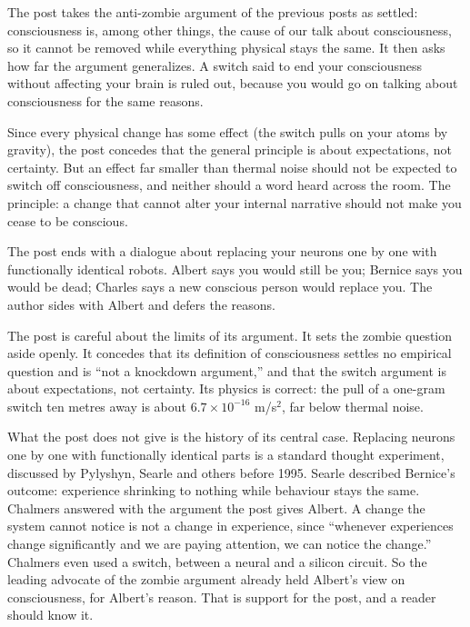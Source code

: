 \begin{afterword}
\summaryhead

The post takes the anti-zombie argument of the previous posts as settled: consciousness is, among other things, the cause of our talk about consciousness, so it cannot be removed while everything physical stays the same. It then asks how far the argument generalizes. A switch said to end your consciousness without affecting your brain is ruled out, because you would go on talking about consciousness for the same reasons.

Since every physical change has some effect (the switch pulls on your atoms by gravity), the post concedes that the general principle is about expectations, not certainty. But an effect far smaller than thermal noise should not be expected to switch off consciousness, and neither should a word heard across the room. The principle: a change that cannot alter your internal narrative should not make you cease to be conscious.

The post ends with a dialogue about replacing your neurons one by one with functionally identical robots. Albert says you would still be you; Bernice says you would be dead; Charles says a new conscious person would replace you. The author sides with Albert and defers the reasons.

\responsehead

The post is careful about the limits of its argument. It sets the zombie question aside openly. It concedes that its definition of consciousness settles no empirical question and is ``not a knockdown argument,'' and that the switch argument is about expectations, not certainty. Its physics is correct: the pull of a one-gram switch ten metres away is about $6.7 \times 10^{-16}$ m/s$^2$, far below thermal noise.

What the post does not give is the history of its central case. Replacing neurons one by one with functionally identical parts is a standard thought experiment, discussed by Pylyshyn, Searle and others before 1995. Searle described Bernice's outcome: experience shrinking to nothing while behaviour stays the same. Chalmers answered with the argument the post gives Albert. A change the system cannot notice is not a change in experience, since ``whenever experiences change significantly and we are paying attention, we can notice the change.'' Chalmers even used a switch, between a neural and a silicon circuit. So the leading advocate of the zombie argument already held Albert's view on consciousness, for Albert's reason. That is support for the post, and a reader should know it.


\end{afterword}

